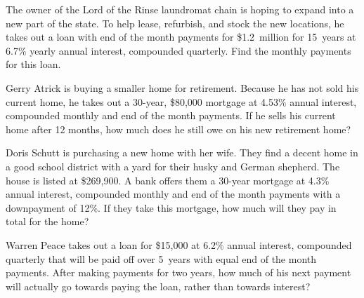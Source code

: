 \documentclass[11pt,letterpaper]{article}
\begin{document}

 The owner of the Lord of the Rinse laundromat chain is hoping to expand into a new part of the state. To help lease, refurbish, and stock the new locations, he takes out a loan with end of the month payments for \$1.2~million for 15~years at 6.7\% yearly annual interest, compounded quarterly. Find the monthly payments for this loan. 



\newpage



 Gerry Atrick is buying a smaller home for retirement. Because he has not sold his current home, he takes out a 30-year, \$80,000 mortgage at 4.53\% annual interest, compounded monthly and end of the month payments. If he sells his current home after 12 months, how much does he still owe on his new retirement home?



\newpage



 Doris Schutt is purchasing a new home with her wife. They find a decent home in a good school district with a yard for their husky and German shepherd. The house is listed at \$269,900. A bank offers them a 30-year mortgage at 4.3\% annual interest, compounded monthly and end of the month payments with a downpayment of 12\%. If they take this mortgage, how much will they pay in total for the home?



\newpage



 Warren Peace takes out a loan for \$15,000 at 6.2\% annual interest, compounded quarterly that will be paid off over 5~years with equal end of the month payments. After making payments for two years, how much of his next payment will actually go towards paying the loan, rather than towards interest? 
\end{document}
